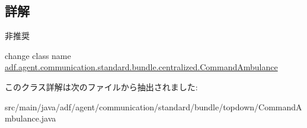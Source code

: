 \subsection{詳解}
\begin{DoxyRefDesc}{非推奨}
\item[\hyperlink{deprecated__deprecated000001}{非推奨}]change class name \hyperlink{classadf_1_1agent_1_1communication_1_1standard_1_1bundle_1_1centralized_1_1CommandAmbulance}{adf.\+agent.\+communication.\+standard.\+bundle.\+centralized.\+Command\+Ambulance} \end{DoxyRefDesc}


このクラス詳解は次のファイルから抽出されました\+:\begin{DoxyCompactItemize}
\item 
src/main/java/adf/agent/communication/standard/bundle/topdown/Command\+Ambulance.\+java\end{DoxyCompactItemize}
